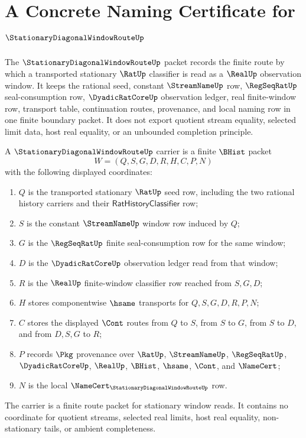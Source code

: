 \chapter{A Concrete Naming Certificate for $\StationaryDiagonalWindowRouteUp$}
\label{ch:concrete-instances-stationarydiagonalwindowroute-namecert}

The $\StationaryDiagonalWindowRouteUp$ packet records the finite route by which a transported stationary $\RatUp$ classifier is read as a $\RealUp$ observation window. It keeps the rational seed, constant $\StreamNameUp$ row, $\RegSeqRatUp$ seal-consumption row, $\DyadicRatCoreUp$ observation ledger, real finite-window row, transport table, continuation routes, provenance, and local naming row in one finite boundary packet. It does not export quotient stream equality, selected limit data, host real equality, or an unbounded completion principle.

\begin{definition}
\label{def:stationary-diagonal-window-route-carrier}
A $\StationaryDiagonalWindowRouteUp$ carrier is a finite $\BHist$ packet
$$
W=(Q,S,G,D,R,H,C,P,N)
$$
with the following displayed coordinates:
\begin{enumerate}
\item $Q$ is the transported stationary $\RatUp$ seed row, including the two rational history carriers and their $\mathsf{RatHistoryClassifier}$ row;
\item $S$ is the constant $\StreamNameUp$ window row induced by $Q$;
\item $G$ is the $\RegSeqRatUp$ finite seal-consumption row for the same window;
\item $D$ is the $\DyadicRatCoreUp$ observation ledger read from that window;
\item $R$ is the $\RealUp$ finite-window classifier row reached from $S,G,D$;
\item $H$ stores componentwise $\hsame$ transports for $Q,S,G,D,R,P,N$;
\item $C$ stores the displayed $\Cont$ routes from $Q$ to $S$, from $S$ to $G$, from $S$ to $D$, and from $D,S,G$ to $R$;
\item $P$ records $\Pkg$ provenance over $\RatUp$, $\StreamNameUp$, $\RegSeqRatUp$, $\DyadicRatCoreUp$, $\RealUp$, $\BHist$, $\hsame$, $\Cont$, and $\NameCert$;
\item $N$ is the local $\NameCert_{\StationaryDiagonalWindowRouteUp}$ row.
\end{enumerate}
The carrier is a finite route packet for stationary window reads. It contains no coordinate for quotient streams, selected real limits, host real equality, non-stationary tails, or ambient completeness.
\end{definition}

